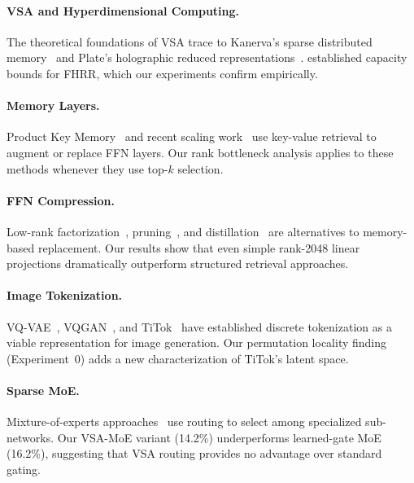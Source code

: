 \documentclass{article}
\begin{document}
\paragraph{VSA and Hyperdimensional Computing.}
The theoretical foundations of VSA trace to Kanerva's sparse distributed memory~\citep{kanerva2009hyperdimensional} and Plate's holographic reduced representations~\citep{plate2003holographic}.
\citet{frady2018theory} established capacity bounds for FHRR, which our experiments confirm empirically.

\paragraph{Memory Layers.}
Product Key Memory~\citep{lample2019large} and recent scaling work~\citep{wu2024memory, sukhbaatar2019augmenting} use key-value retrieval to augment or replace FFN layers.
Our rank bottleneck analysis applies to these methods whenever they use top-$k$ selection.

\paragraph{FFN Compression.}
Low-rank factorization~\citep{hsu2022language}, pruning~\citep{frantar2023sparsegpt}, and distillation~\citep{hinton2015distilling} are alternatives to memory-based replacement.
Our results show that even simple rank-2048 linear projections dramatically outperform structured retrieval approaches.

\paragraph{Image Tokenization.}
VQ-VAE~\citep{van2017neural}, VQGAN~\citep{esser2021taming}, and TiTok~\citep{yu2024image} have established discrete tokenization as a viable representation for image generation.
Our permutation locality finding (Experiment~0) adds a new characterization of TiTok's latent space.

\paragraph{Sparse MoE.}
Mixture-of-experts approaches~\citep{shazeer2017outrageously, fedus2022switch, jiang2024mixtral} use routing to select among specialized sub-networks.
Our VSA-MoE variant (14.2\%) underperforms learned-gate MoE (16.2\%), suggesting that VSA routing provides no advantage over standard gating.

\end{document}
